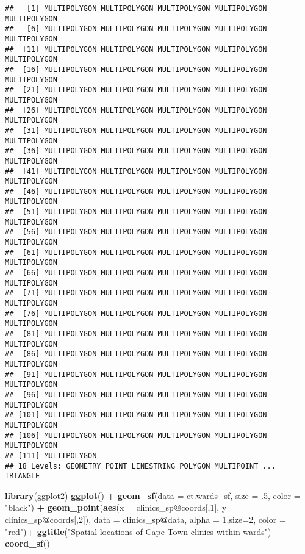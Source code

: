 \documentclass[
]{book}
\newenvironment{Shaded}{\begin{snugshade}}{\end{snugshade}}
\newcommand{\DataTypeTok}[1]{\textcolor[rgb]{0.13,0.29,0.53}{#1}}
\newcommand{\DecValTok}[1]{\textcolor[rgb]{0.00,0.00,0.81}{#1}}
\newcommand{\FloatTok}[1]{\textcolor[rgb]{0.00,0.00,0.81}{#1}}
\newcommand{\KeywordTok}[1]{\textcolor[rgb]{0.13,0.29,0.53}{\textbf{#1}}}
\newcommand{\NormalTok}[1]{#1}
\newcommand{\OperatorTok}[1]{\textcolor[rgb]{0.81,0.36,0.00}{\textbf{#1}}}
\newcommand{\StringTok}[1]{\textcolor[rgb]{0.31,0.60,0.02}{#1}}
\begin{document}
\begin{verbatim}
##   [1] MULTIPOLYGON MULTIPOLYGON MULTIPOLYGON MULTIPOLYGON MULTIPOLYGON
##   [6] MULTIPOLYGON MULTIPOLYGON MULTIPOLYGON MULTIPOLYGON MULTIPOLYGON
##  [11] MULTIPOLYGON MULTIPOLYGON MULTIPOLYGON MULTIPOLYGON MULTIPOLYGON
##  [16] MULTIPOLYGON MULTIPOLYGON MULTIPOLYGON MULTIPOLYGON MULTIPOLYGON
##  [21] MULTIPOLYGON MULTIPOLYGON MULTIPOLYGON MULTIPOLYGON MULTIPOLYGON
##  [26] MULTIPOLYGON MULTIPOLYGON MULTIPOLYGON MULTIPOLYGON MULTIPOLYGON
##  [31] MULTIPOLYGON MULTIPOLYGON MULTIPOLYGON MULTIPOLYGON MULTIPOLYGON
##  [36] MULTIPOLYGON MULTIPOLYGON MULTIPOLYGON MULTIPOLYGON MULTIPOLYGON
##  [41] MULTIPOLYGON MULTIPOLYGON MULTIPOLYGON MULTIPOLYGON MULTIPOLYGON
##  [46] MULTIPOLYGON MULTIPOLYGON MULTIPOLYGON MULTIPOLYGON MULTIPOLYGON
##  [51] MULTIPOLYGON MULTIPOLYGON MULTIPOLYGON MULTIPOLYGON MULTIPOLYGON
##  [56] MULTIPOLYGON MULTIPOLYGON MULTIPOLYGON MULTIPOLYGON MULTIPOLYGON
##  [61] MULTIPOLYGON MULTIPOLYGON MULTIPOLYGON MULTIPOLYGON MULTIPOLYGON
##  [66] MULTIPOLYGON MULTIPOLYGON MULTIPOLYGON MULTIPOLYGON MULTIPOLYGON
##  [71] MULTIPOLYGON MULTIPOLYGON MULTIPOLYGON MULTIPOLYGON MULTIPOLYGON
##  [76] MULTIPOLYGON MULTIPOLYGON MULTIPOLYGON MULTIPOLYGON MULTIPOLYGON
##  [81] MULTIPOLYGON MULTIPOLYGON MULTIPOLYGON MULTIPOLYGON MULTIPOLYGON
##  [86] MULTIPOLYGON MULTIPOLYGON MULTIPOLYGON MULTIPOLYGON MULTIPOLYGON
##  [91] MULTIPOLYGON MULTIPOLYGON MULTIPOLYGON MULTIPOLYGON MULTIPOLYGON
##  [96] MULTIPOLYGON MULTIPOLYGON MULTIPOLYGON MULTIPOLYGON MULTIPOLYGON
## [101] MULTIPOLYGON MULTIPOLYGON MULTIPOLYGON MULTIPOLYGON MULTIPOLYGON
## [106] MULTIPOLYGON MULTIPOLYGON MULTIPOLYGON MULTIPOLYGON MULTIPOLYGON
## [111] MULTIPOLYGON
## 18 Levels: GEOMETRY POINT LINESTRING POLYGON MULTIPOINT ... TRIANGLE
\end{verbatim}

\begin{Shaded}
\begin{Highlighting}[]
\KeywordTok{library}\NormalTok{(ggplot2)}
\KeywordTok{ggplot}\NormalTok{() }\OperatorTok{+}\StringTok{ }
\StringTok{  }\KeywordTok{geom_sf}\NormalTok{(}\DataTypeTok{data =}\NormalTok{ ct.wards_sf, }\DataTypeTok{size =} \FloatTok{.5}\NormalTok{, }\DataTypeTok{color =} \StringTok{"black"}\NormalTok{) }\OperatorTok{+}\StringTok{ }
\StringTok{  }\KeywordTok{geom_point}\NormalTok{(}\KeywordTok{aes}\NormalTok{(}\DataTypeTok{x =}\NormalTok{ clinics_sp}\OperatorTok{@}\NormalTok{coords[,}\DecValTok{1}\NormalTok{], }\DataTypeTok{y =}\NormalTok{ clinics_sp}\OperatorTok{@}\NormalTok{coords[,}\DecValTok{2}\NormalTok{]),}
             \DataTypeTok{data =}\NormalTok{ clinics_sp}\OperatorTok{@}\NormalTok{data, }\DataTypeTok{alpha =} \DecValTok{1}\NormalTok{,}\DataTypeTok{size=}\DecValTok{2}\NormalTok{, }\DataTypeTok{color =} \StringTok{"red"}\NormalTok{)}\OperatorTok{+}\StringTok{ }
\StringTok{  }\KeywordTok{ggtitle}\NormalTok{(}\StringTok{"Spatial locations of Cape Town clinics within wards"}\NormalTok{) }\OperatorTok{+}\StringTok{ }
\StringTok{  }\KeywordTok{coord_sf}\NormalTok{()}
\end{Highlighting}
\end{Shaded}
\end{document}
